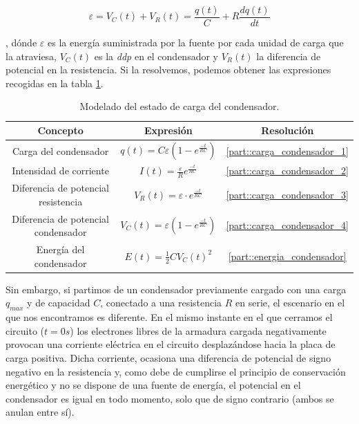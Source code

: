 \documentclass[../main.tex]{subfiles}
\begin{document}
\begin{equation}
    \varepsilon = V_C(t) + V_R(t) = \frac{q(t)}{C} + R\frac{d q(t)}{d t}
    \label{eqq::balance_energetico_rc_1}
\end{equation}

, dónde $\varepsilon$ es la energía suministrada por la fuente por cada unidad de carga que la atraviesa, $V_C(t)$ es la \textit{ddp} en el condensador y $V_R(t)$ la diferencia de potencial en la resistencia. Si la resolvemos, podemos obtener las expresiones recogidas en la tabla \ref{tab::ecuaciones_carga_rc}.


\begin{table}[!ht]
    \begin{center}
        \begin{tabular}{|| c | c | c ||}
            \hline
            \textbf{Concepto} & \textbf{Expresión} &  \textbf{Resolución}\\ \hline
            Carga del condensador & $q(t) = C\varepsilon \left( 1 - e^{\frac{-t}{RC}} \right)$ & \ref{part::carga_condensador_1} \\
            Intensidad de corriente & $I(t) = \frac{\varepsilon}{R}e^{\frac{-t}{RC}}$ & \ref{part::carga_condensador_2} \\
            Diferencia de potencial resistencia & $V_R(t) = \varepsilon \cdot e^{\frac{-t}{RC}}$ & \ref{part::carga_condensador_3} \\ 
            Diferencia de potencial condensador & $V_C(t) = \varepsilon \left(1- e^{\frac{-t}{RC}}\right)$ & \ref{part::carga_condensador_4} \\ 
            Energía del condensador & $E(t) = \frac{1}{2}CV_C(t)^2 $ & \ref{part::energia_condensador}
            \\
            \hline
            \end{tabular}
            \caption{Modelado del estado de carga del condensador.}
            \label{tab::ecuaciones_carga_rc}
    \end{center}
\end{table}

Sin embargo, si partimos de un condensador previamente cargado con una carga $q_{max}$ y de capacidad $C$, conectado a una resistencia $R$ en serie, el escenario en el que nos encontramos es diferente. En el mismo instante en el que cerramos el circuito ($t=0s$) los electrones libres de la armadura cargada negativamente provocan una corriente eléctrica en el circuito desplazándose hacia la placa de carga positiva. Dicha corriente, ocasiona una diferencia de potencial de signo negativo en la resistencia y, como debe de cumplirse el principio de conservación energético y no se dispone de una fuente de energía, el potencial en el condensador es igual en todo momento, solo que de signo contrario (ambos se anulan entre sí). \\
\end{document}
